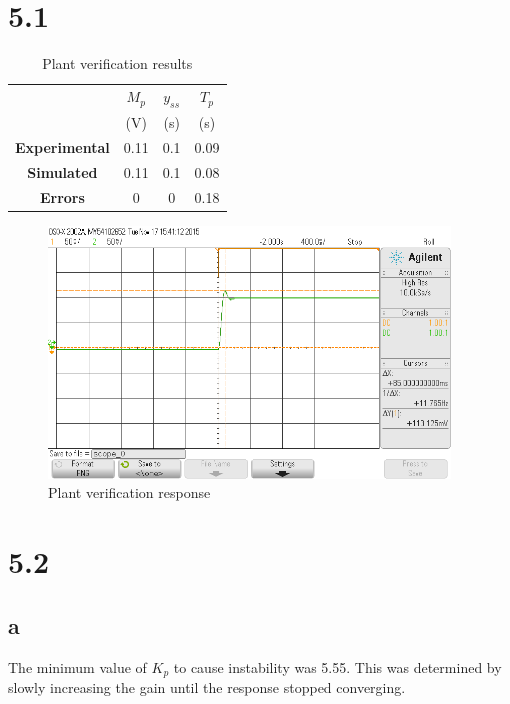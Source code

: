 \documentclass{article}
\begin{document}


\section*{5.1} %

\begin{table}[!htbp]
\centering
    \begin{tabular}{|c|c|c|c|}
        \hline
        &  $M_p$ & $y_{ss}$ & $T_p$ \\
        &  (V) & (s) & (s) \\
        \hline
        \textbf{Experimental} & 0.11 & 0.1 & 0.09\\
        \hline
        \textbf{Simulated} & 0.11 & 0.1 & 0.08\\
        \hline
        \textbf{Errors} & 0 & 0 & 0.18\\
        \hline
    \end{tabular}
    \caption{Plant verification results}
\end{table}


\begin{figure}[!htbp]
    \centering
    \includegraphics[width=0.95\textwidth]{5_1.png}
    \caption{Plant verification response}
\end{figure}

\section*{5.2} %
\subsection*{a} %
The minimum value of $K_p$ to cause instability was 5.55. This was determined by slowly increasing the gain until the response stopped converging.
\newpage
\end{document}
